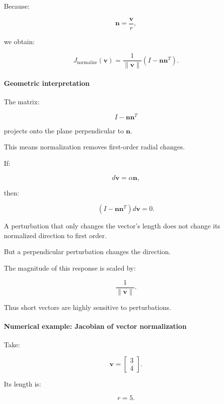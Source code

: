 Because:

\[
\mathbf n=\frac{\mathbf v}{r},
\]

we obtain:

\[
\boxed{ J_{\mathrm{normalize}}(\mathbf v) = \frac1{\|\mathbf v\|} (I-\mathbf n\mathbf n^T) }.
\]

\paragraph{Geometric interpretation}\label{02-foundations-ii-ch027-geometric-interpretation}

\hypertarget{02-foundations-ii-ch027-geometric-interpretation}{}

The matrix:

\[
I-\mathbf n\mathbf n^T
\]

projects onto the plane perpendicular to \(\mathbf n\).

This means normalization removes first-order radial changes.

If:

\[
d\mathbf v=\alpha\mathbf n,
\]

then:

\[
(I-\mathbf n\mathbf n^T)d\mathbf v=0.
\]

A perturbation that only changes the vector's length does not change its normalized direction to first order.

But a perpendicular perturbation changes the direction.

The magnitude of this response is scaled by:

\[
\frac1{\|\mathbf v\|}.
\]

Thus short vectors are highly sensitive to perturbations.

\paragraph{Numerical example: Jacobian of vector normalization}\label{02-foundations-ii-ch027-numerical-example-jacobian-of-vector-normalization}

\hypertarget{02-foundations-ii-ch027-numerical-example-jacobian-of-vector-normalization}{}

Take:

\[
\mathbf v= \begin{bmatrix} 3\\4 \end{bmatrix}.
\]

Its length is:

\[
r=5.
\]

